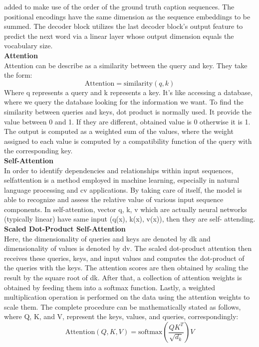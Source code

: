 \documentclass{ioereport}
\begin{document}
added to make use of the order of the ground truth caption sequences. The positional
encodings have the same dimension as the sequence embeddings to be summed. The
decoder block utilizes the last decoder block’s output feature to predict the next word
via a linear layer whose output dimension equals the vocabulary size.\\
\textbf{Attention}\\
Attention can be describe as a similarity between the query and key. They take the form:
\begin{equation}
\text{Attention}= \text{similarity}(q, k)
\end{equation}
Where q represents a query and k represents a key. It’s like accessing a database, where
we query the database looking for the information we want. To find the similarity
between queries and keys, dot product is normally used. It provide the value between 0
and 1. If they are different, obtained value is 0 otherwise it is 1. The output is computed
as a weighted sum of the values, where the weight assigned to each value is computed
by a compatibility function of the query with the corresponding key.\\
\textbf{Self-Attention}\\
In order to identify dependencies and relationships within input sequences, selfattention is a method employed in machine learning, especially in natural language
processing and \gls{cv} applications. By taking care of itself, the model is able
to recognize and assess the relative value of various input sequence components. In
self-attention, vector q, k, v which are actually neural networks (typically linear) have
same input (q(x), k(x), v(x)), then they are self- attending.\\
\textbf{Scaled Dot-Product Self-Attention}\\
Here, the dimensionality of queries and keys are denoted by dk and dimensionality of
values is denoted by dv. The scaled dot-product attention then receives these queries,
keys, and input values and computes the dot-product of the queries with the keys. The
attention scores are then obtained by scaling the result by the square root of dk. After
that, a collection of attention weights is obtained by feeding them into a softmax
function. Lastly, a weighted multiplication operation is performed on the data using the
attention weights to scale them. The complete procedure can be mathematically stated
as follows, where Q, K, and V, represent the keys, values, and queries, correspondingly:
\begin{equation}
\text{Attention}(Q, K, V) = \text{softmax}\left(\frac{QK^T}{\sqrt{d_k}}\right) V
\end{equation}
\end{document}

